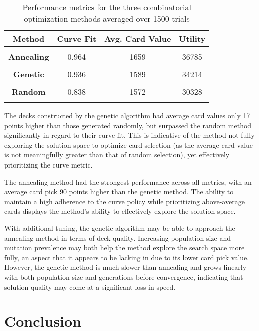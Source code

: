 \documentclass[letterpaper]{article} %
\begin{document}
\begin{table}
\begin{center}
\begin{tabular}{c c c c}
\hline
\textbf{Method}&Curve Fit&Avg. Card Value&Utility \\\hline\\
\textbf{Annealing} & 0.964 & 1659 & 36785 \\\\
\textbf{Genetic} & 0.936 & 1589 & 34214 \\\\
\textbf{Random} & 0.838 & 1572 & 30328  \\\\
\hline
\end{tabular}
\end{center}
\caption{Performance metrics for the three combinatorial optimization methods averaged over 1500 trials}
\end{table}

The decks constructed by the genetic algorithm had average card values only 17 points higher than those generated randomly, but surpassed the random method significantly in regard to their curve fit. This is indicative of the method not fully exploring the solution space to optimize card selection (as the average card value is not meaningfully greater than that of random selection), yet effectively prioritizing the curve metric.

The annealing method had the strongest performance across all metrics, with an average card pick 90 points higher than the genetic method. The ability to maintain a high adherence to the curve policy while prioritizing above-average cards displays the method's ability to effectively explore the solution space.

With additional tuning, the genetic algorithm may be able to approach the annealing method in terms of deck quality. Increasing population size and mutation prevalence may both help the method explore the search space more fully, an aspect that it appears to be lacking in due to its lower card pick value. However, the genetic method is much slower than annealing and grows linearly with both population size and generations before convergence, indicating that solution quality may come at a significant loss in speed.

\section{Conclusion}
\end{document}
